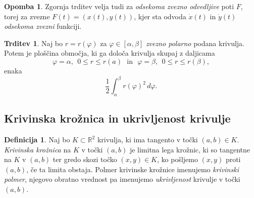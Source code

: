 \documentclass[11pt]{article}
\newcommand{\R}{\mathbb{R}}
\theoremstyle{definition}
\newtheorem{definicija}{Definicija}[section]
\theoremstyle{definition}
\newtheorem{trditev}{Trditev}[section]
\theoremstyle{definition}
\theoremstyle{theorem}
\newtheorem*{opomba}{Opomba}
\begin{document}
\begin{opomba}

Zgornja trditev velja tudi za \textit{odsekoma zvezno odvedljive} poti $F$, torej za zvezne $F(t) = (x(t), y(t))$, kjer sta odvoda $\dot{x}(t)$ in $\dot{y}(t)$ \textit{odsekoma zvezni} funkciji.

\end{opomba}
\vspace{0.5cm}

\begin{trditev}

Naj bo $r = r(\varphi)$ za $\varphi \in [\alpha, \beta]$ \textit{zvezno polarno} podana \hbox{krivulja}. Potem je ploščina območja, ki ga določa krivulja skupaj z \hbox{daljicama} 
$$\varphi = \alpha, ~~0 \leq r \leq r(a) ~~~\text{in}~~~ \varphi = \beta, ~~0 \leq r \leq r(\beta),$$
enaka
$$\frac{1}{2} \int_\alpha^\beta r(\varphi)^2\,d\varphi.$$

\end{trditev}
\vspace{0.5cm}


\subsection{Krivinska krožnica in ukrivljenost krivulje}
\vspace{0.5cm}

\begin{definicija}

Naj bo $K \subset \R^2$ krivulja, ki ima tangento v točki $(a, b) \in K$. \textit{Krivinska krožnica} na $K$ v točki $(a, b)$ je limitna lega krožnic, ki so tangentne na $K$ v $(a, b)$ ter gredo skozi točko $(x, y) \in K$, ko pošljemo $(x, y)$ proti $(a, b)$, če ta limita obstaja. Polmer krivinske krožnice imenujemo \textit{krivinski polmer}, njegovo obratno vrednost pa imenujemo \textit{ukrivljenost} krivulje v točki $(a, b)$.

\end{definicija}
\vspace{0.5cm}
\end{document}
